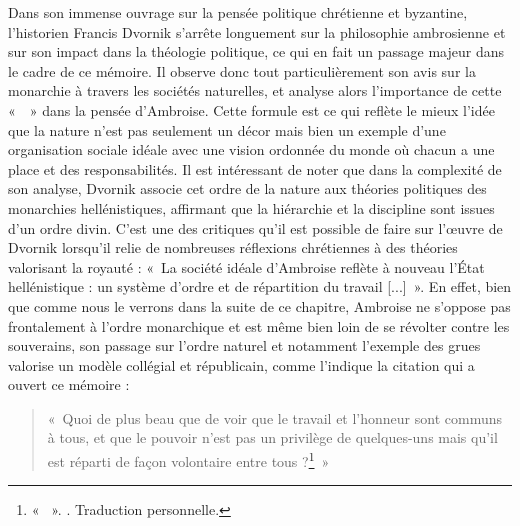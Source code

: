 \bigskip

Dans son immense ouvrage sur la pensée politique chrétienne et byzantine, l'historien Francis Dvornik s'arrête longuement sur la philosophie ambrosienne et sur son impact dans la théologie politique, ce qui en fait un passage majeur dans le cadre de ce mémoire. Il observe donc tout particulièrement son avis sur la monarchie à travers les sociétés naturelles, et analyse alors l'importance de cette «~~» dans la pensée d'Ambroise\autocite[674]{dvornik_political}. Cette formule est ce qui reflète le mieux l'idée que la nature n'est pas seulement un décor mais bien un exemple d'une organisation sociale idéale avec une vision ordonnée du monde où chacun a une place et des responsabilités. Il est intéressant de noter que dans la complexité de son analyse, Dvornik associe cet ordre de la nature aux théories politiques des monarchies hellénistiques, affirmant que la hiérarchie et la discipline sont issues d'un ordre divin. C'est une des critiques qu'il est possible de faire sur l'œuvre de Dvornik lorsqu'il relie de nombreuses réflexions chrétiennes à des théories valorisant la royauté : «~La société idéale d'Ambroise reflète à nouveau l'État hellénistique : un système d'ordre et de répartition du travail [...]~»\autocite[676]{dvornik_political}. En effet, bien que comme nous le verrons dans la suite de ce chapitre, Ambroise ne s'oppose pas frontalement à l'ordre monarchique et est même bien loin de se révolter contre les souverains, son passage sur l'ordre naturel et notamment l'exemple des grues valorise un modèle collégial et républicain, comme l'indique la citation qui a ouvert ce mémoire :

\bigskip

\begin{quote}
    «~Quoi de plus beau que de voir que le travail et l’honneur sont communs à tous, et que le pouvoir n’est pas un privilège de quelques-uns mais qu’il est réparti de façon volontaire entre tous ?\footnote{« ~». \cite[\nopp V, 15, 51]{ambroise_csel_32_1}. Traduction personnelle.}~»
\end{quote}

\bigskip

